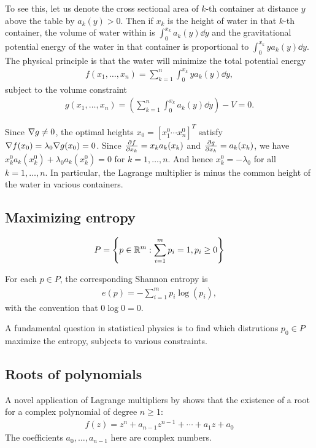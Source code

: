 To see this, let us denote the cross sectional area of $k$-th container at distance $y$ above the table by $a_k(y) > 0$.
Then if $x_k$ is the height of water in that $k$-th container, the volume of water within is $\int_0^{x_k} a_k(y) \dd y$ and the gravitational potential energy of the water in that container is proportional to $\int_0^{x_k} y a_k(y) \dd y$.
The physical principle is that the water will minimize the total potential energy
\begin{align}
    f(x_1, \dots, x_n) = \sum_{k=1}^{n} \int _0^{x_k} y a_k(y) \dd y,
\end{align}
subject to the volume constraint
\begin{align}
    g(x_1, \dots, x_n) = \left(\sum_{k=1}^{n} \int _0^{x_k} a_k(y) \dd y \right) - V = 0.
\end{align}

Since $\nabla g \ne 0$, the optimal heights $x_0 = [x_1^0 \cdots x_n^0]^T$ satisfy $\nabla f(x_0) = \lambda_0 \nabla g(x_0) = 0$.
Since $\frac{\partial f}{\partial x_k} = x_k a_k(x_k)$ and $\frac{\partial g}{\partial x_k} = a_k(x_k)$, we have $x_k^0 a_k(x_k^0) + \lambda_0 a_k(x_k^0) = 0$ for $k = 1, \dots, n$.
And hence $x_k^0 = -\lambda_0$ for all $k = 1, \dots, n$.
In particular, the Lagrange multiplier is minus the common height of the water in various containers. 
\subsection{Maximizing entropy}

\begin{align}
    P = \left\{ p \in \mathbb{R}^m: \sum_{i=1}^{m} p_i = 1, p_i \ge 0 \right\}
\end{align}

For each $p \in P$, the corresponding Shannon entropy is
\begin{align}
    e(p) = - \sum_{i=1}^{m} p_i \log(p_i),
\end{align}
with the convention that $0 \log 0 = 0$. 

A fundamental question in statistical physics is to find which distrutions $p_0 \in P$ maximize the entropy, subjects to various constraints.

\subsection{Roots of polynomials}

A novel application of Lagrange multipliers by  shows that the existence of a root for a complex polynomial of degree $n \ge 1$:
\begin{align}
f(z) = z^n + a_{n-1} z^{n-1} + \cdots + a_1 z + a_0
\end{align}
The coefficients $a_0, \dots, a_{n-1}$ here are complex numbers.

